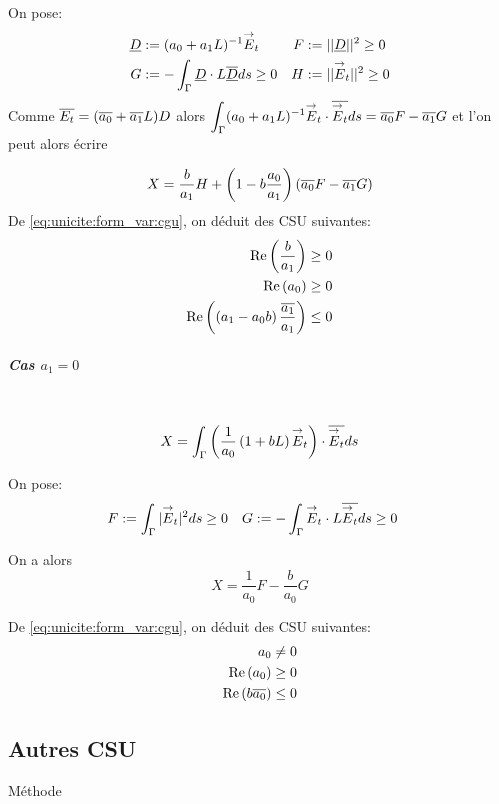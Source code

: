 					On pose:
					\begin{align*}
						\underline{D} &:= (a_0 + a_1 L)^{-1}{\overset{\rightarrow}{E}}_t & F&:= || \underline{D} || ^2 \ge 0  \\
						G&:= -\int_\Gamma \underline{D} \cdot L{\overline{\underline{D}}} ds \ge 0 & H &:= || {\overset{\rightarrow}{E}}_t || ^2 \ge 0
					\end{align*}
					Comme \({\overline{E_t}} = ({\overline{a_0}} + {\overline{a_1}}L)D\) alors \(\displaystyle\int_\Gamma (a_0 +a_1 L) ^{-1}{\overset{\rightarrow}{E}}_t\cdot {\overline{{\overset{\rightarrow}{E}}_t}} ds = {\overline{a_0}} F - {\overline{a_1}} G\) et l'on peut alors écrire

					\begin{equation}
						\label{eq:unicite:form_var:decomp_cgu_ci1_a1}
						X = \dfrac{b}{a_1}H   + \left(1-b\dfrac{a_0}{a_1}\right)\left({\overline{a_0}} F - {\overline{a_1}} G\right)
					\end{equation}
					De \eqref{eq:unicite:form_var:cgu}, on déduit des CSU suivantes:
					\begin{align}
						\operatorname{Re}\left(\dfrac{b}{a_1}\right) \ge 0 \\
						\operatorname{Re}\left(a_0\right) \ge 0 \\
						\operatorname{Re}\left(\left(a_1-a_0 b\right)\dfrac{{\overline{a_1}}}{a_1}\right) \le 0
					\end{align}

				\subparagraph{Cas \(a_1=0\)}
					~
					\[
						X = \int_\Gamma \left( \dfrac{1}{a_0}\left(1+bL\right){\overset{\rightarrow}{E}}_t\right) \cdot {\overline{{\overset{\rightarrow}{E}}_t}} ds
					\]

					On pose:
					\begin{align*}
						F&:= \int_\Gamma | {\overset{\rightarrow}{E}}_t | ^2 ds \ge 0 & G &:= -\int_\Gamma {\overset{\rightarrow}{E}}_t \cdot L{\overline{{\overset{\rightarrow}{E}}_t}} ds \ge 0
					\end{align*}

					On a alors
					\begin{equation}
						\label{eq:unicite:form_var:decomp_cgu_ci1_a1_nul}
						X = \frac{1}{a_0}F - \frac{b}{a_0}G
					\end{equation}

					De \eqref{eq:unicite:form_var:cgu}, on déduit des CSU suivantes:
					\begin{align}
						a_0 \not= 0\\
						\operatorname{Re}\left(a_0\right) \ge 0\\
						\operatorname{Re}\left(b{\overline{a_0}}\right) \le 0
					\end{align}

	\subsection{Autres CSU}
		Méthode \cite{stupfel_implementation_2015}

